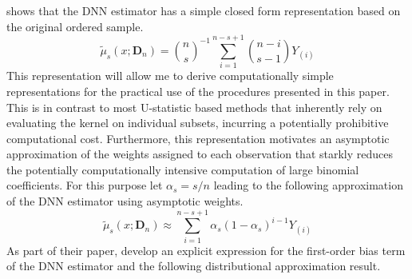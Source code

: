 \citet{steele_exact_2009} shows that the DNN estimator has a simple closed form representation based on the original ordered sample.
\begin{equation}\label{eq:DNN_closed_form}
	\tilde{\mu}_{s}(x; \mathbf{D}_n)
	= \binom{n}{s}^{-1} \sum_{i = 1}^{n - s + 1}\binom{n - i}{s - 1}Y_{(i)}
\end{equation}
This representation will allow me to derive computationally simple representations for the practical use of the procedures presented in this paper.
This is in contrast to most U-statistic based methods that inherently rely on evaluating the kernel on individual subsets, incurring a potentially prohibitive computational cost.
Furthermore, this representation motivates an asymptotic approximation of the weights assigned to each observation that starkly reduces the potentially computationally intensive computation of large binomial coefficients.
For this purpose let $\alpha_{s} = s/n$ leading to the following approximation of the DNN estimator using asymptotic weights.
\begin{equation}\label{eq:DNN_approx_closed_form}
	\tilde{\mu}_{s}(x; \mathbf{D}_n)
	\approx  \sum_{i = 1}^{n - s + 1} \alpha_{s} \left(1 - \alpha_{s}\right)^{i - 1} Y_{(i)}
\end{equation}
As part of their paper, \citet{demirkaya_optimal_2024} develop an explicit expression for the first-order bias term of the DNN estimator and the following distributional approximation result.
